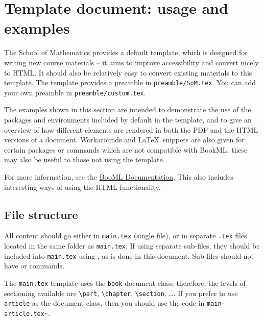 \chapter{Template document: usage and examples}
\label{demo}

The School of Mathematics provides a default template, which is designed for writing new course materials -- it aims to improve accessibility and convert nicely to HTML. It should also be relatively easy to convert existing materials to this template. The template provides a preamble in \verb|preamble/SoM.tex|. You can add your own preamble in \verb|preamble/custom.tex|.

The examples shown in this section are intended to demonstrate the use of the packages and environments included by default in the template, and to give an overview of how different elements are rendered in both the PDF and the HTML versions of a document. Workarounds and \LaTeX\ snippets are also given for certain packages or commands which are not compatible with BookML; these may also be useful to those not using the template.

For more information, see the \href{https://vlmantova.github.io/bookml/#S3.SS1}{BooML Documentation}. This also includes interesting ways of using the HTML functionality.

\section{File structure}
\label{demo:struct}


All content should go either in \verb|main.tex| (single file), or in separate \verb|.tex| files located in the same folder as \verb|main.tex|. If using separate sub-files, they should be included into \verb|main.tex| using \verb||, as is done in this document. Sub-files should not have \verb|| or \verb|| commands.

The \verb|main.tex| template uses the \verb|book| document class; therefore, the levels of sectioning available are \verb|\part|, \verb|\chapter|, \verb|\section|, \ldots. If you prefer to use \verb|article| as the document class, then you should use the code in \verb|main-article.tex~|.

